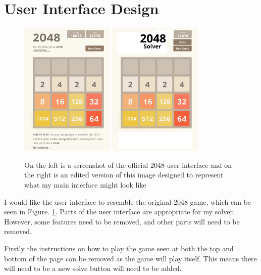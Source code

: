 \documentclass{article}
\begin{document}
\section{User Interface Design}
\label{sec:ui}
\begin{figure}
    \centering
    \includegraphics[width=0.4\textwidth]{2048-interface.png}
    \includegraphics[width=0.4\textwidth]{interface-mockup.png}
    \caption{On the left is a screenshot of the official 2048 user interface \cite{game2048} and on the right
    is an edited version of this image designed to represent what my main interface might look like}
    \label{fig:2048interface}
\end{figure}
I would like the user interface to  resemble the original 2048 game, which can be seen in Figure. \ref{fig:2048interface}.
Parts of the user interface are appropriate for my solver. However, some features need to be removed, and other parts will need to be removed.

Firstly the instructions on how to play the game seen at both the top and bottom of the page can be removed
as the game will play itself. This means there will need to be a new solve button will need to be added.
\end{document}
